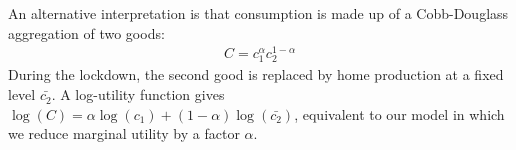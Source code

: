 \documentclass[./ConsumptionResponse]{subfiles}
\begin{document}
An alternative interpretation is that consumption is made up of a Cobb-Douglass aggregation of two goods:
\begin{eqnarray*}
	C = c_1^{\alpha}c_2^{1-\alpha}
\end{eqnarray*}
During the lockdown, the second good is replaced by home production at a fixed level $\bar{c_2}$. A log-utility function gives $\log(C) = \alpha\log(c_1) + (1-\alpha)\log(\bar{c_2})$, equivalent to our model in which we reduce marginal utility by a factor $\alpha$.



\onlyinsubfile{}
\end{document}
